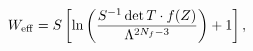 \begin{equation}\label{Eq:Weff3}
W_{\rm eff}=S 
\left[ 
\ln
\left(
\frac{
S^{-1}\det T\cdot f(Z)
}
{
	\Lambda^{2N_f-3}
}
\right)
+1
\right],
\end{equation}

